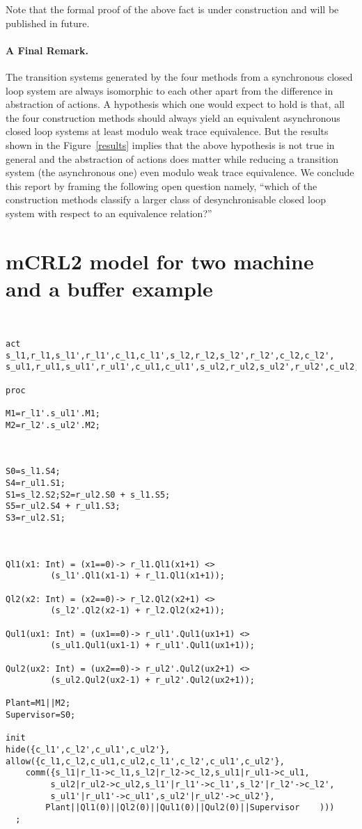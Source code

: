 \documentclass[a4paper,english,final]{article}
\theoremstyle{plain}
\theoremstyle{definition}
\begin{document}
Note that the formal proof of the above fact is under construction and will be published in future.

\paragraph{A Final Remark.} The transition systems generated by the four methods from a synchronous closed loop system are always isomorphic to each other apart from the difference in abstraction of actions. A hypothesis which one would expect to hold is that, all the four construction methods should always yield an equivalent asynchronous closed loop systems at least modulo weak trace equivalence. But the results shown in the Figure~\ref{results} implies that the above hypothesis is not true in general and the abstraction of actions does matter while reducing a transition system (the asynchronous one) even modulo weak trace equivalence. We conclude this report by framing the following open question namely, ``which of the construction methods classify a larger class of desynchronisable closed loop system with respect to an equivalence relation?''





\appendix
\section{mCRL2 model for two machine and a buffer example}\label{appendix-2machbuf}
\begin{verbatim}


act
s_l1,r_l1,s_l1',r_l1',c_l1,c_l1',s_l2,r_l2,s_l2',r_l2',c_l2,c_l2',
s_ul1,r_ul1,s_ul1',r_ul1',c_ul1,c_ul1',s_ul2,r_ul2,s_ul2',r_ul2',c_ul2,c_ul2';

proc

M1=r_l1'.s_ul1'.M1;
M2=r_l2'.s_ul2'.M2;



S0=s_l1.S4;
S4=r_ul1.S1;
S1=s_l2.S2;S2=r_ul2.S0 + s_l1.S5;
S5=r_ul2.S4 + r_ul1.S3;
S3=r_ul2.S1;



Ql1(x1: Int) = (x1==0)-> r_l1.Ql1(x1+1) <>
		 (s_l1'.Ql1(x1-1) + r_l1.Ql1(x1+1));

Ql2(x2: Int) = (x2==0)-> r_l2.Ql2(x2+1) <>
		 (s_l2'.Ql2(x2-1) + r_l2.Ql2(x2+1));

Qul1(ux1: Int) = (ux1==0)-> r_ul1'.Qul1(ux1+1) <>
		 (s_ul1.Qul1(ux1-1) + r_ul1'.Qul1(ux1+1));

Qul2(ux2: Int) = (ux2==0)-> r_ul2'.Qul2(ux2+1) <>
		 (s_ul2.Qul2(ux2-1) + r_ul2'.Qul2(ux2+1));

Plant=M1||M2;
Supervisor=S0;

init
hide({c_l1',c_l2',c_ul1',c_ul2'},
allow({c_l1,c_l2,c_ul1,c_ul2,c_l1',c_l2',c_ul1',c_ul2'},
    comm({s_l1|r_l1->c_l1,s_l2|r_l2->c_l2,s_ul1|r_ul1->c_ul1,
         s_ul2|r_ul2->c_ul2,s_l1'|r_l1'->c_l1',s_l2'|r_l2'->c_l2',
         s_ul1'|r_ul1'->c_ul1',s_ul2'|r_ul2'->c_ul2'},
        Plant||Ql1(0)||Ql2(0)||Qul1(0)||Qul2(0)||Supervisor    )))
  ;
\end{verbatim}
\end{document}
